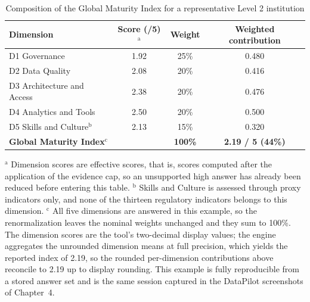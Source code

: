 \begin{table}[H]
\centering
\caption{Composition of the Global Maturity Index for a representative Level 2 institution} \label{tab:profile-breakdown}
\begin{tabular}{|p{4.6cm}|c|c|c|}
\hline
\textbf{Dimension} & \textbf{Score (/5)}$^{\mathrm{a}}$ & \textbf{Weight} & \textbf{Weighted contribution} \\
\hline
D1 Governance & 1.92 & 25\% & 0.480 \\
D2 Data Quality & 2.08 & 20\% & 0.416 \\
D3 Architecture and Access & 2.38 & 20\% & 0.476 \\
D4 Analytics and Tools & 2.50 & 20\% & 0.500 \\
D5 Skills and Culture$^{\mathrm{b}}$ & 2.13 & 15\% & 0.320 \\
\hline
\textbf{Global Maturity Index}$^{\mathrm{c}}$ & & \textbf{100\%} & \textbf{2.19 / 5 (44\%)} \\
\hline
\end{tabular}
\par\vspace{4pt}
\parbox{12.5cm}{\footnotesize
$^{\mathrm{a}}$ Dimension scores are effective scores, that is, scores computed after the application of the evidence cap, so an unsupported high answer has already been reduced before entering this table.
$^{\mathrm{b}}$ Skills and Culture is assessed through proxy indicators only, and none of the thirteen regulatory indicators belongs to this dimension.
$^{\mathrm{c}}$ All five dimensions are answered in this example, so the renormalization leaves the nominal weights unchanged and they sum to 100\%. The dimension scores are the tool's two-decimal display values; the engine aggregates the unrounded dimension means at full precision, which yields the reported index of 2.19, so the rounded per-dimension contributions above reconcile to 2.19 up to display rounding. This example is fully reproducible from a stored answer set and is the same session captured in the DataPilot screenshots of Chapter~4.}

\end{table}

